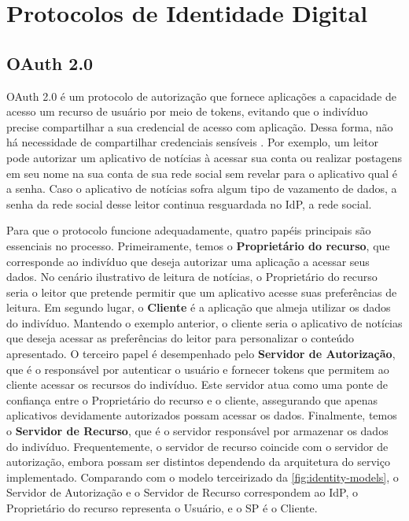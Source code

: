 \section{Protocolos de Identidade Digital}\label{subsection:protocolos}

\subsection{OAuth 2.0}\label{subsubsection:oauth}

OAuth 2.0 é um protocolo  de autorização que fornece aplicações a capacidade de acesso um recurso de usuário por meio de tokens, evitando que o indivíduo precise compartilhar a sua credencial de acesso com aplicação. Dessa forma, não há necessidade de compartilhar credenciais sensíveis \cite{oauth}. Por exemplo, um leitor pode autorizar um aplicativo de notícias à acessar sua conta ou realizar postagens em seu nome na sua conta de sua rede social sem revelar para o aplicativo qual é a senha. Caso o aplicativo de notícias sofra algum tipo de vazamento de dados, a senha da rede social desse leitor continua resguardada no \acs{IdP}, a rede social.

Para que o protocolo funcione adequadamente, quatro papéis principais são essenciais no processo. Primeiramente, temos o \textbf{Proprietário do recurso}, que corresponde ao indivíduo que deseja autorizar uma aplicação a acessar seus dados. No cenário ilustrativo de leitura de notícias, o Proprietário do recurso seria o leitor que pretende permitir que um aplicativo acesse suas preferências de leitura. Em segundo lugar, o \textbf{Cliente} é a aplicação que almeja utilizar os dados do indivíduo. Mantendo o exemplo anterior, o cliente seria o aplicativo de notícias que deseja acessar as preferências do leitor para personalizar o conteúdo apresentado. O terceiro papel é desempenhado pelo \textbf{Servidor de Autorização}, que é o responsável por autenticar o usuário e fornecer tokens que permitem ao cliente acessar os recursos do indivíduo. Este servidor atua como uma ponte de confiança entre o Proprietário do recurso e o cliente, assegurando que apenas aplicativos devidamente autorizados possam acessar os dados. Finalmente, temos o \textbf{Servidor de Recurso}, que é o servidor responsável por armazenar os dados do indivíduo. Frequentemente, o servidor de recurso coincide com o servidor de autorização, embora possam ser distintos dependendo da arquitetura do serviço implementado. Comparando com o modelo terceirizado da \autoref{fig:identity-models}, o Servidor de Autorização e o Servidor de Recurso correspondem ao \acs{IdP}, o Proprietário do recurso representa o Usuário, e o \acs{SP} é o Cliente.

